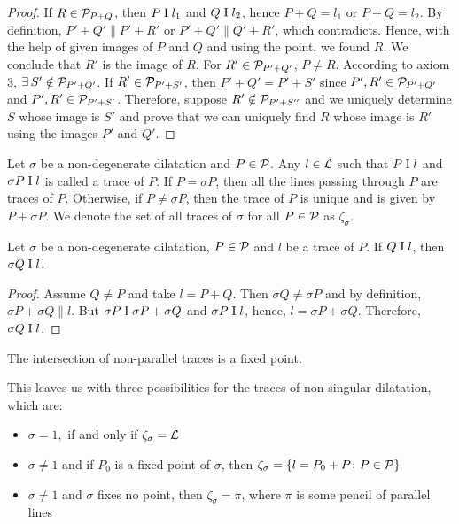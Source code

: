 \begin{proof}
    \vspace{1ex}

    If $R \in \mathcal{P}_{P+Q}$, then $P \mathrel\text{I} l_1$ and $Q \mathrel\text{I} l_2$, hence $P+Q = l_1$ or $P+Q = l_2$. By definition, $P'+Q' \parallel P' + R'$ or $P'+Q' \parallel Q' + R'$, which contradicts. Hence, with the help of given images of $P$ and $Q$ and using the point, we found $R$. We conclude that $R'$ is the image of $R$. For $R' \in \mathcal{P}_{P'+Q'}$, $P \neq R$. According to axiom 3, $\exists\, S' \notin \mathcal{P}_{P'+Q'}$. If $R' \in \mathcal{P}_{P'+S'}$,  then $P'+Q'=P'+S'$ since $P',R' \in \mathcal{P}_{P'+Q'}$ and $P',R' \in \mathcal{P}_{P'+S'}$. Therefore, suppose $R' \notin \mathcal{P}_{P'+S''}$ and we uniquely determine $S$ whose image is $S'$ and prove that we can uniquely find $R$ whose image is $R'$ using the images $P'$ and $Q'$.
\end{proof}

\begin{definition}
    Let $\sigma$ be a non-degenerate dilatation and $P \in \mathcal{P}$. Any $l \in \mathcal{L}$ such that $P \mathrel\text{I} l$ and $\sigma P \mathrel\text{I} l$ is called a trace of $P$. If $P = \sigma P$, then all the lines passing through $P$ are traces of $P$. Otherwise, if $P \neq \sigma P$, then the trace of $P$ is unique and is given by $P + \sigma P$. We denote the set of all traces of $\sigma$ for all $P \in \mathcal{P}$ as $\zeta_\sigma$.
\end{definition}

\begin{theorem} \label{thm:dil_on_same_line}
    Let $\sigma$ be a non-degenerate dilatation, $P \in \mathcal{P}$ and $l$ be a trace of $P$. If $Q \mathrel\text{I} l$, then $\sigma Q \mathrel\text{I} l$. 
\end{theorem}

\begin{proof}
    Assume $Q \neq P$ and take $l=P+Q$. Then $\sigma Q \neq \sigma P$ and by definition, $\sigma P + \sigma Q \parallel l$. But $\sigma P \mathrel\text{I} \sigma P + \sigma Q$ and $ \sigma P \mathrel\text{I} l$, hence, $l=\sigma P + \sigma Q.$ Therefore, $\sigma Q \mathrel\text{I} l$.
\end{proof}

\begin{coro}
    The intersection of non-parallel traces is a fixed point.
\end{coro}

\noindent
This leaves us with three possibilities for the traces of non-singular dilatation, which are:
\begin{itemize}
    \item $\sigma=1,$ if and only if $\zeta_\sigma = \mathcal{L}$
    \item $\sigma \neq 1$ and if $P_0$ is a fixed point of $\sigma$, then $\zeta_\sigma = \{l=P_0+P\colon P \in \mathcal{P}\}$
    \item $\sigma \neq 1$ and $\sigma$ fixes no point, then $\zeta_\sigma = \pi$, where $\pi$ is some pencil of parallel lines
\end{itemize}

